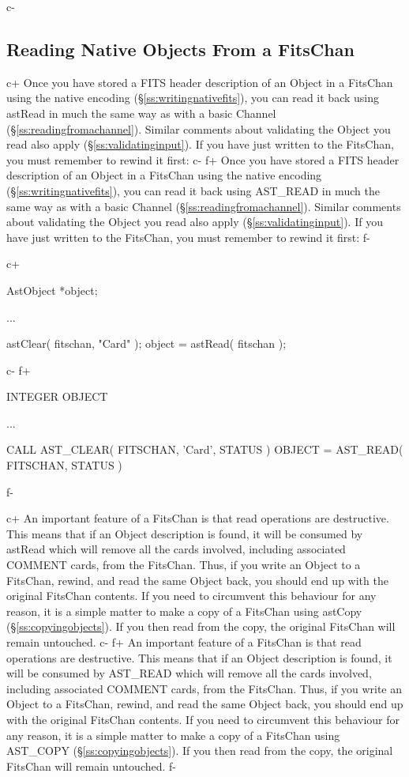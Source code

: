 \documentclass[twoside,11pt]{starlink}
\providecommand{\secref}[1]{\S\ref{#1}}
\begin{document}
c-

\subsection{\label{ss:readingnativefits}Reading Native Objects From a FitsChan}

c+
Once you have stored a FITS header description of an Object in a
FitsChan using the native encoding (\secref{ss:writingnativefits}),
you can read it back using astRead in much the same way as with a
basic Channel (\secref{ss:readingfromachannel}). Similar comments
about validating the Object you read also apply
(\secref{ss:validatinginput}).  If you have just written to the
FitsChan, you must remember to rewind it first:
c-
f+
Once you have stored a FITS header description of an Object in a
FitsChan using the native encoding (\secref{ss:writingnativefits}),
you can read it back using AST\_READ in much the same way as with a
basic Channel (\secref{ss:readingfromachannel}). Similar comments
about validating the Object you read also apply
(\secref{ss:validatinginput}).  If you have just written to the
FitsChan, you must remember to rewind it first:
f-

c+
\small
\begin{terminalv}
AstObject *object;

...

astClear( fitschan, "Card" );
object = astRead( fitschan );
\end{terminalv}
\normalsize
c-
f+
\small
\begin{terminalv}
      INTEGER OBJECT

      ...

      CALL AST_CLEAR( FITSCHAN, 'Card', STATUS )
      OBJECT = AST_READ( FITSCHAN, STATUS )
\end{terminalv}
\normalsize
f-

c+
An important feature of a FitsChan is that read operations are
destructive. This means that if an Object description is found, it
will be consumed by astRead which will remove all the cards involved,
including associated COMMENT cards, from the FitsChan. Thus, if you
write an Object to a FitsChan, rewind, and read the same Object back,
you should end up with the original FitsChan contents.  If you need to
circumvent this behaviour for any reason, it is a simple matter to
make a copy of a FitsChan using astCopy
(\secref{ss:copyingobjects}). If you then read from the copy, the
original FitsChan will remain untouched.
c-
f+
An important feature of a FitsChan is that read operations are
destructive. This means that if an Object description is found, it
will be consumed by AST\_READ which will remove all the cards
involved, including associated COMMENT cards, from the FitsChan. Thus,
if you write an Object to a FitsChan, rewind, and read the same Object
back, you should end up with the original FitsChan contents.  If you
need to circumvent this behaviour for any reason, it is a simple
matter to make a copy of a FitsChan using AST\_COPY
(\secref{ss:copyingobjects}). If you then read from the copy, the
original FitsChan will remain untouched.
f-
\end{document}
